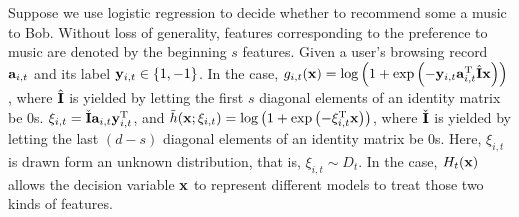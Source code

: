 \documentclass{article}
\begin{document}
{Suppose we use logistic regression to decide whether to recommend some a music to Bob. Without loss of generality, features corresponding to the preference to music are denoted by the beginning $s$ features.  Given a user's browsing record ${\bf a}_{i,t}$ and its label ${\bf y}_{i,t} \in \{1,-1\}$. In the case, $g_{i,t}({\bf x}) = \log \left( 1 + \exp\left( -{\bf y}_{i,t}{\bf a}_{i,t}^{\rm T} \hat{{\bf I}} {\bf x} \right)  \right)$, where $\hat{{\bf I}}$ is yielded by letting the first $s$ diagonal elements of an identity matrix be $0$s. $\xi_{i,t} = \check{{\bf I}} {\bf a}_{i,t} {\bf y}_{i,t}^{\rm T}$, and $\tilde{h}({\bf x};\xi_{i,t}) = \log \left( 1 + \exp\left( - \xi_{i,t}^{\rm T} {\bf x} \right) \right)$, where $\check{{\bf I}}$ is yielded by letting the last $(d-s)$ diagonal elements of an identity matrix be $0$s. Here, $\xi_{i,t}$ is drawn form an unknown distribution, that is, $\xi_{i,t} \sim D_t$. In the case, $H_t({\bf x})$ allows the decision variable ${\bf x}$ to represent different models to treat those two kinds of features.



%
%



}
\end{document}
